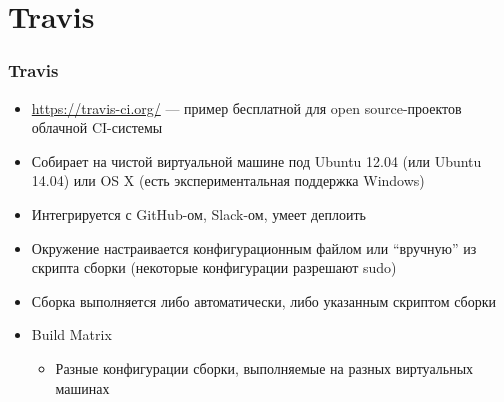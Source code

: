 \documentclass[xetex,mathserif,serif]{beamer}
\begin{document}
	\section{Travis}

	\begin{frame}
		\frametitle{Travis}
		\begin{itemize}
			\item \url{https://travis-ci.org/} --- пример бесплатной для open source-проектов облачной CI-системы
			\item Собирает на чистой виртуальной машине под Ubuntu 12.04 (или Ubuntu 14.04) или OS X (есть экспериментальная поддержка Windows)
			\item Интегрируется с GitHub-ом, Slack-ом, умеет деплоить
			\item Окружение настраивается конфигурационным файлом или ``вручную'' из скрипта сборки (некоторые конфигурации разрешают sudo)
			\item Сборка выполняется либо автоматически, либо указанным скриптом сборки
			\item Build Matrix
			\begin{itemize}
				\item Разные конфигурации сборки, выполняемые на разных виртуальных машинах
			\end{itemize}
		\end{itemize}
	\end{frame}
\end{document}
